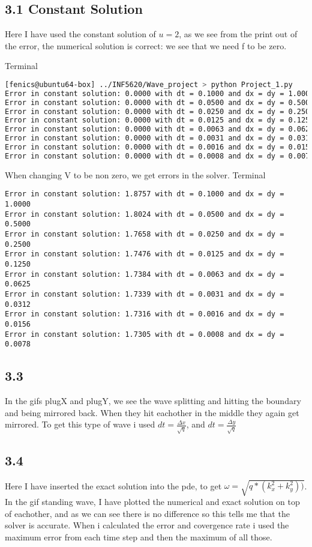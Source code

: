 \documentclass[a4paper,norsk]{article}
\begin{document}
\subsection*{3.1 Constant Solution}
Here I have used the constant solution of $u = 2 $, as we see from the print out of the error, the numerical solution is correct:
we see that we need f to be zero.

\noindent Terminal
\begin{lstlisting}[language=bash]
[fenics@ubuntu64-box] ../INF5620/Wave_project > python Project_1.py 
Error in constant solution: 0.0000 with dt = 0.1000 and dx = dy = 1.0000
Error in constant solution: 0.0000 with dt = 0.0500 and dx = dy = 0.5000
Error in constant solution: 0.0000 with dt = 0.0250 and dx = dy = 0.2500
Error in constant solution: 0.0000 with dt = 0.0125 and dx = dy = 0.1250
Error in constant solution: 0.0000 with dt = 0.0063 and dx = dy = 0.0625
Error in constant solution: 0.0000 with dt = 0.0031 and dx = dy = 0.0312
Error in constant solution: 0.0000 with dt = 0.0016 and dx = dy = 0.0156
Error in constant solution: 0.0000 with dt = 0.0008 and dx = dy = 0.0078

\end{lstlisting}
When changing V to be non zero, we get errors in the solver.
\noindent Terminal
\begin{lstlisting}
Error in constant solution: 1.8757 with dt = 0.1000 and dx = dy = 1.0000
Error in constant solution: 1.8024 with dt = 0.0500 and dx = dy = 0.5000
Error in constant solution: 1.7658 with dt = 0.0250 and dx = dy = 0.2500
Error in constant solution: 1.7476 with dt = 0.0125 and dx = dy = 0.1250
Error in constant solution: 1.7384 with dt = 0.0063 and dx = dy = 0.0625
Error in constant solution: 1.7339 with dt = 0.0031 and dx = dy = 0.0312
Error in constant solution: 1.7316 with dt = 0.0016 and dx = dy = 0.0156
Error in constant solution: 1.7305 with dt = 0.0008 and dx = dy = 0.0078
\end{lstlisting}
\subsection*{3.3}
In the gifs plugX and plugY, we see the wave splitting and hitting the boundary and being mirrored back. When they hit eachother in the middle they again get mirrored. To get this type of wave i used  $dt = \frac{\Delta x}{\sqrt{q}}$, and $dt = \frac{\Delta y}{\sqrt{q}}$


\subsection*{3.4}
Here I have inserted the exact solution into the pde, to get $\omega = \sqrt{q*(k_x^2+k_y^2))}$.
In the gif standing wave, I have plotted the numerical and exact solution on top of eachother, and as we can see there is no difference so this tells me that the solver is accurate. When i calculated the error and covergence rate i used the maximum error from each time step and then the maximum of all those.
\end{document}
